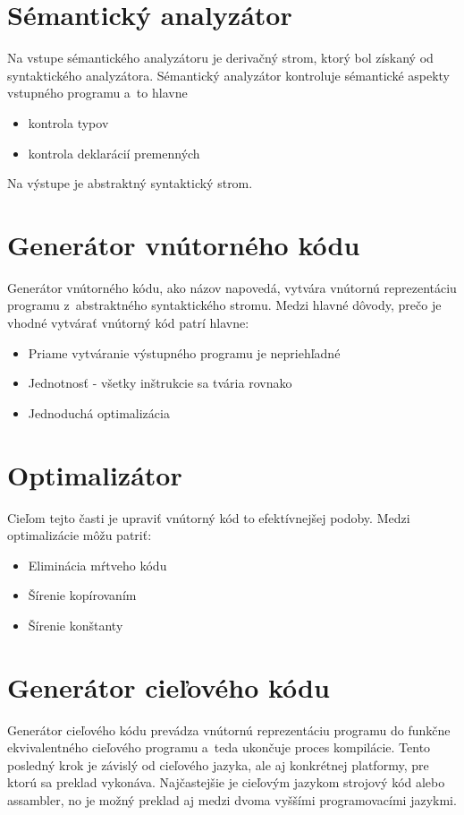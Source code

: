 \section{Sémantický analyzátor}
Na vstupe sémantického analyzátoru je derivačný strom, ktorý bol získaný od
syntaktického analyzátora. Sémantický analyzátor kontroluje sémantické aspekty
vstupného programu a~to hlavne 
\begin{itemize}
    \item kontrola typov
    \item kontrola deklarácií premenných
\end{itemize}
Na výstupe je abstraktný syntaktický strom.

\section{Generátor vnútorného kódu}
Generátor vnútorného kódu, ako názov napovedá, vytvára vnútornú reprezentáciu programu
z~abstraktného syntaktického stromu. Medzi hlavné dôvody, prečo je vhodné
vytvárať vnútorný kód patrí hlavne:
\begin{itemize}
    \item Priame vytváranie výstupného programu je nepriehľadné
    \item Jednotnosť - všetky inštrukcie sa tvária rovnako
    \item Jednoduchá optimalizácia
\end{itemize}

\section{Optimalizátor}
Cieľom tejto časti je upraviť vnútorný kód to efektívnejšej podoby.
Medzi optimalizácie môžu patriť:
\begin{itemize}
    \item Eliminácia mŕtveho kódu
    \item Šírenie kopírovaním
    \item Šírenie konštanty
\end{itemize}

\section{Generátor cieľového kódu}
Generátor cieľového kódu prevádza vnútornú reprezentáciu programu do funkčne ekvivalentného cieľového programu a~teda ukončuje proces kompilácie. Tento posledný krok je závislý od cieľového jazyka, ale aj konkrétnej platformy, pre ktorú sa preklad vykonáva. Najčastejšie je cieľovým jazykom strojový kód alebo assambler, no je možný preklad aj medzi dvoma vyššími programovacími jazykmi\cite{meduna}. 

